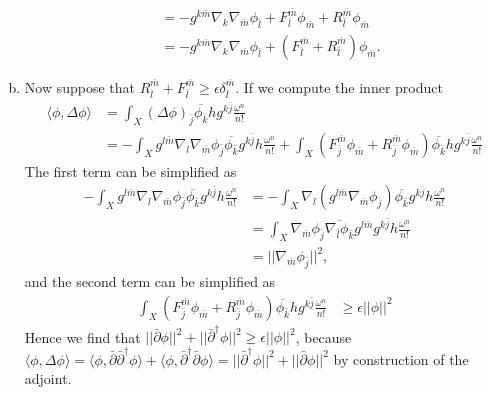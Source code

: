 \documentclass{../mathnotes}
\begin{document}
\begin{enumerate}[(a)]
\begin{align*}
            &=-g^{k\bar m}\nabla_k\nabla_{\bar m}\phi_{\bar l}+ F_{\bar l}^{\bar m}\phi_{\bar m}+R^{\bar m}_{\bar l}\phi_{\bar m}\\
            &=-g^{k\bar m}\nabla_k\nabla_{\bar m}\phi_{\bar l}+ (F_{\bar l}^{\bar m}+R^{\bar m}_{\bar l})\phi_{\bar m}.
        \end{align*}
    \item Now suppose that $R_{\bar l}^{\bar m}+F_{\bar l}^{\bar m}\geq \epsilon\delta_{\bar l}^{\bar m}$. If we compute
        the inner product
        \begin{align*}
            \langle \phi,\Delta\phi\rangle &= \int_X (\Delta\phi)_{\bar j}\overline{\phi_{\bar k}}h g^{k\bar j} \frac{\omega^n}{n!}\\
            &= -\int_Xg^{l\bar m}\nabla_l\nabla_{\bar m}\phi_{\bar j}\overline{\phi_{\bar k}}g^{k\bar j}h\frac{\omega^n}{n!}+
            \int_X(F_{\bar j}^{\bar m}\phi_{\bar m}+R_{\bar j}^{\bar m}\phi_{\bar m})\overline{\phi_{\bar k}}hg^{k\bar j}\frac{\omega^n}{n!}
        \end{align*}
        The first term can be simplified as
        \begin{align*}
            -\int_X g^{l\bar m}\nabla_l\nabla_{\bar m}\phi_{\bar j}\overline{\phi_{\bar k}}g^{k\bar j}h\frac{\omega^n}{n!}
            &= -\int_X\nabla_{l}(g^{l\bar m}\nabla_{\bar m}\phi_{\bar j})\overline{\phi_{\bar k}}g^{k\bar j}h\frac{\omega^n}{n!}\\
            &=\int_X\nabla_{\bar m}\phi_{\bar j}\overline{\nabla_{\bar l}\phi_{\bar k}}g^{l\bar m}g^{k\bar j}h\frac{\omega^n}{n!}\\
            &=||\nabla_{\bar m}\phi_{\bar j}||^2,
        \end{align*}
        and the second term can be simplified as
        \begin{align*}
            \int_X(F_{\bar j}^{\bar m}\phi_{\bar m}+R_{\bar j}^{\bar m}\phi_{\bar m})\overline{\phi_{\bar k}}hg^{k\bar j}\frac{\omega^n}{n!}
            &\geq\epsilon||\phi||^2
        \end{align*}
        Hence we find that $||\bar\partial\phi||^2+||\bar\partial^\dagger\phi||^2\geq\epsilon||\phi||^2$,
        because $\langle\phi,\Delta\phi\rangle=\langle\phi,\bar\partial\bar\partial^\dagger\phi\rangle+\langle\phi,\bar\partial^\dagger\bar\partial\phi\rangle
        =||\bar\partial^\dagger\phi||^2+||\bar\partial\phi||^2$ by construction of the adjoint.


\end{enumerate}
\end{document}
